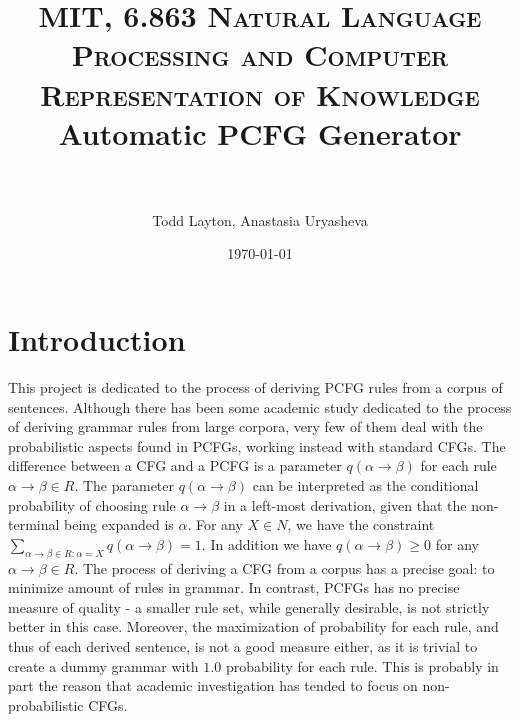 \documentclass[paper=a4, fontsize=11pt]{scrartcl} %
\title{	
\normalfont \normalsize 
\textsc{MIT, 6.863 Natural Language Processing and Computer Representation of Knowledge}
\horrule{0.5pt} \\[0.4cm] %
\huge Automatic PCFG Generator \\ %
\horrule{2pt} \\[0.5cm] %
}
\author {Todd Layton, Anastasia Uryasheva}
\date{\normalsize\today}
\numberwithin{equation}{section} %
\numberwithin{figure}{section} %
\numberwithin{table}{section} %
\begin{document}
\maketitle %


\section{Introduction}

This project is dedicated to the process of deriving PCFG rules from a corpus of sentences. Although there has been some academic study dedicated to the process of deriving grammar rules from large corpora, very few of them deal with the probabilistic aspects found in PCFGs, working instead with standard CFGs. The difference between a CFG and a PCFG is a parameter \begin{math} q(\alpha \rightarrow \beta) \end{math} for each rule \begin{math} \alpha\rightarrow \beta \in R \end{math}. The parameter \begin{math} q(\alpha \rightarrow \beta) \end{math} can be interpreted as the conditional probability of choosing rule \begin{math} \alpha \rightarrow \beta \end{math} in a left-most derivation, given that the non-terminal being expanded is \begin{math} \alpha \end{math}. For any \begin{math} X \in N \end{math}, we have the constraint \begin{math} \sum_{\alpha\rightarrow\beta\in R:\alpha=X} q(\alpha\rightarrow\beta) = 1 \end{math}. In addition we have \begin{math} q(\alpha\rightarrow\beta) \geqslant 0 \end{math} for any \begin{math} \alpha \rightarrow \beta \in R \end{math}. 
The process of deriving a CFG from a corpus has a precise goal: to minimize amount of rules in grammar. In contrast, PCFGs has no precise measure of quality - a smaller rule set, while generally desirable, is not strictly better in this case. Moreover, the maximization of probability for each rule, and thus of each derived sentence, is not a good measure either,  as it is trivial to create a dummy grammar with $1.0$ probability for each rule. This is probably in part the reason that academic investigation has tended to focus on  non-probabilistic CFGs.
\end{document}
